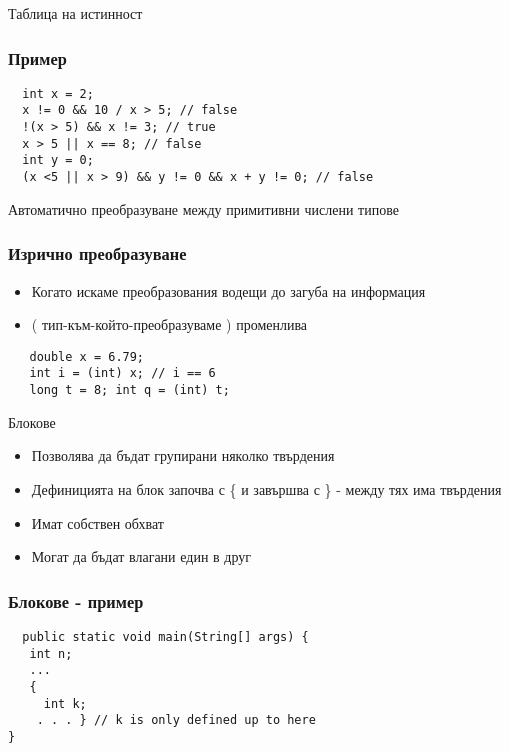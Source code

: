 \documentclass{beamer}
\begin{document}
\begin{frame}{Таблица на истинност}
  
\end{frame}

\begin{frame}[fragile]
  \frametitle{Пример}
\begin{lstlisting}
  int x = 2;
  x != 0 && 10 / x > 5; // false
  !(x > 5) && x != 3; // true
  x > 5 || x == 8; // false
  int y = 0;
  (x <5 || x > 9) && y != 0 && x + y != 0; // false
\end{lstlisting}
\end{frame}


\begin{frame}{Автоматично преобразуване между примитивни числени типове}
  
\end{frame}


\begin{frame}[fragile]
  \frametitle{Изрично преобразуване}
  \begin{itemize}
  \item   Когато искаме преобразования водещи
    до загуба на информация
  \item ( тип-към-който-преобразуваме ) променлива
  \end{itemize}
  \begin{lstlisting}
   double x = 6.79;
   int i = (int) x; // i == 6
   long t = 8; int q = (int) t;
  \end{lstlisting}
\end{frame}

\begin{frame}{Блокове}
  \begin{itemize}
  \item Позволява да бъдат групирани няколко
    твърдения
   \item Дефиницията на блок започва с \{ и
      завършва с \} - между тях има
    твърдения
   \item Имат собствен обхват
   \item Могат да бъдат влагани един в друг
  \end{itemize}
\end{frame}

\begin{frame}[fragile]
  \frametitle{Блокове - пример}
\begin{lstlisting}
  public static void main(String[] args) {
   int n;
   ...
   {
     int k;
    . . . } // k is only defined up to here
}
\end{lstlisting}
\end{frame}
\end{document}
